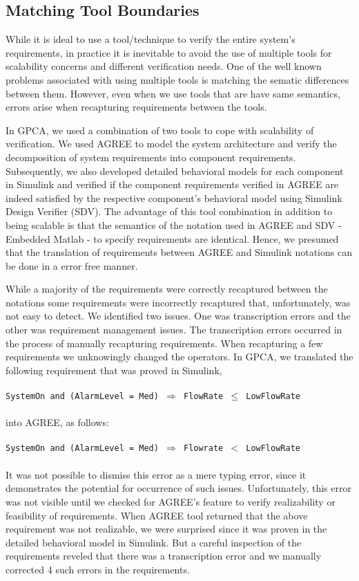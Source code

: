 \subsection{Matching Tool Boundaries}

While it is ideal to use a tool/technique to verify the entire system's requirements, in practice it is inevitable to avoid the use of multiple tools for scalability concerns and different verification needs. One of the well known problems associated with using multiple tools is matching the sematic differences between them. However, even when we use tools that are have same semantics, errors arise when recapturing requirements between the tools.

In GPCA, we used a combination of two tools to cope with scalability of verification. We used AGREE to model the system architecture and verify the decomposition of system requirements into component requirements. Subsequently, we also developed detailed behavioral models for each component in Simulink and verified if the component requirements verified in AGREE are indeed satisfied by the respective component's behavioral model using Simulink Design Verifier (SDV). The advantage of this tool combination in addition to being scalable is that the semantics of the notation used in AGREE and SDV - Embedded Matlab - to specify requirements are identical. Hence, we presumed that the translation of requirements between AGREE and Simulink notations can be done in a error free manner.

While a majority of the requirements were correctly recaptured between the notations some requirements were incorrectly recaptured that, unfortunately, was not easy to detect. We identified two issues. One was transcription errors and the other was requirement management issues. The transcription errors occurred in the process of manually recapturing requirements. When recapturing a few requirements we unknowingly changed the operators. In GPCA, we translated the following requirement that was proved in Simulink,
\\\\
\texttt{SystemOn and (AlarmLevel = Med) $\Rightarrow$ 
FlowRate $\leq$ LowFlowRate}
\\\\
into AGREE, as follows:
\\\\
\texttt{SystemOn and (AlarmLevel = Med) $\Rightarrow$ 
Flowrate $<$ LowFlowRate}
\\\\
It was not possible to dismiss this error as a mere typing error, since it demonstrates the potential for occurrence of such issues. Unfortunately, this error was not visible until we checked for AGREE's feature to verify realizability or feasibility of requirements. When AGREE tool returned that the above requirement was not realizable, we were surprised since it was proven in the detailed behavioral model in Simulink. But a careful inspection of the requirements reveled that there was a transcription error and we manually corrected 4 such errors in the requirements.

